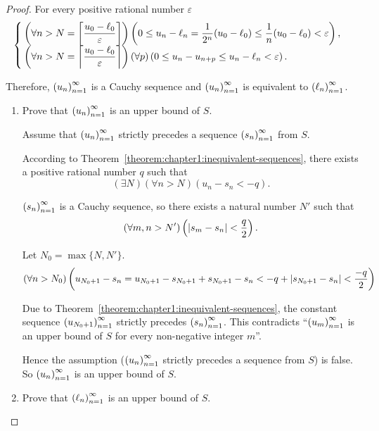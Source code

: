 \begin{proof}
    For every positive rational number $\varepsilon$
    \[
        \begin{cases}
            \left(\forall n > N = \left\lceil{\dfrac{u_{0} - \ell_{0}}{\varepsilon}}\right\rceil\right)\left( 0 \le u_{n} - \ell_{n} = \dfrac{1}{2^{n}}(u_{0} - \ell_{0}) \le \dfrac{1}{n}(u_{0} - \ell_{0}) < \varepsilon \right), \\
            \left(\forall n > N = \left\lceil{\dfrac{u_{0} - \ell_{0}}{\varepsilon}}\right\rceil\right)(\forall p)\left( 0 \le u_{n} - u_{n+p} \le u_{n} - \ell_{n} < \varepsilon \right).
        \end{cases}
    \]

    Therefore, ${\left({u_{n}}\right)}^{\infty}_{n=1}$ is a Cauchy sequence and ${\left({u_{n}}\right)}^{\infty}_{n=1}$ is equivalent to ${\left({\ell_{n}}\right)}^{\infty}_{n=1}$.

    \begin{enumerate}[label={\textbf{Step \arabic*.}},itemindent=0.5cm]
        \item Prove that ${\left({u_{n}}\right)}^{\infty}_{n=1}$ is an upper bound of $S$.

              Assume that ${\left({u_{n}}\right)}^{\infty}_{n=1}$ strictly precedes a sequence ${\left({s_{n}}\right)}^{\infty}_{n=1}$ from $S$.

              According to Theorem~\ref{theorem:chapter1:inequivalent-sequences}, there exists a positive rational number $q$ such that
              \[
                  (\exists N)(\forall n > N)(u_{n} - s_{n} < -q).
              \]

              ${\left({s_{n}}\right)}^{\infty}_{n=1}$ is a Cauchy sequence, so there exists a natural number $N'$ such that
              \[
                  (\forall m, n > N')\left(\left\vert{s_{m} - s_{n}}\right\vert < \frac{q}{2}\right).
              \]

              Let $N_{0} = \max\{ N, N' \}$.
              \[
                  (\forall n > N_{0})\left(u_{N_{0} + 1} - s_{n} = u_{N_{0} + 1} - s_{N_{0} + 1} + s_{N_{0} + 1} - s_{n} < -q + \left\vert{s_{N_{0} + 1} - s_{n}}\right\vert < \frac{-q}{2} \right)
              \]

              Due to Theorem~\ref{theorem:chapter1:inequivalent-sequences}, the constant sequence ${\left({u_{N_{0} + 1}}\right)}^{\infty}_{n=1}$ strictly precedes ${\left({s_{n}}\right)}^{\infty}_{n=1}$. This contradicts ``${\left({u_{m}}\right)}^{\infty}_{n=1}$ is an upper bound of $S$ for every non-negative integer $m$''.

              Hence the assumption (${\left({u_{n}}\right)}^{\infty}_{n=1}$ strictly precedes a sequence from $S$) is false. So ${\left({u_{n}}\right)}^{\infty}_{n=1}$ is an upper bound of $S$.
        \item Prove that ${\left({\ell_{n}}\right)}^{\infty}_{n=1}$ is an upper bound of $S$.


\end{enumerate}
\end{proof}
